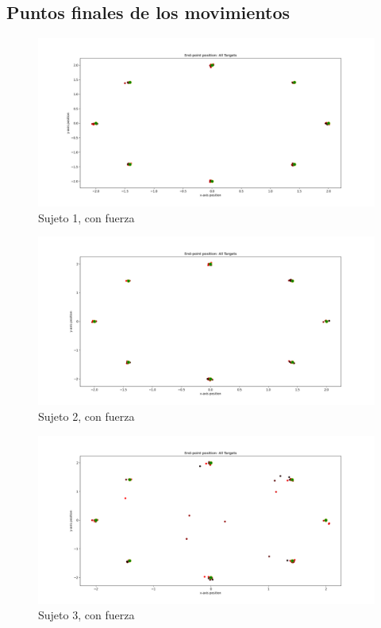 \documentclass[a4paper,11pt, oneside]{book}
\begin{document}
\subsection{Puntos finales de los movimientos}
\label{anexo-3}
\begin{figure}[H]
	\includegraphics[width=\linewidth]{sujeto1/force/trayectorias_puntos}
	\caption{Sujeto 1, con fuerza}
	\label{1-2-1}
\end{figure}
\begin{figure}[H]
	\includegraphics[width=\linewidth]{sujeto2/force/trayectorias_puntos}
	\caption{Sujeto 2, con fuerza}
	\label{2-2-1}
\end{figure}
\begin{figure}[H]
	\includegraphics[width=\linewidth]{sujeto3/force/trayectorias_puntos}
	\caption{Sujeto 3, con fuerza}
	\label{3-2-1}
\end{figure}
\end{document}
